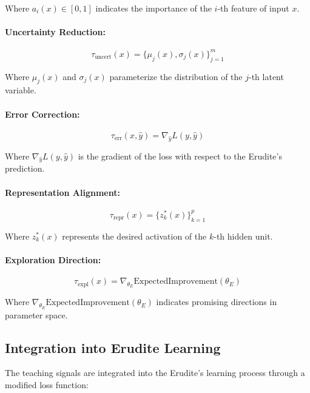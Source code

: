 Where $a_i(x) \in [0,1]$ indicates the importance of the $i$-th feature of input $x$.

\paragraph{Uncertainty Reduction:}
\begin{equation}
\tau_{\text{uncert}}(x) = \{\mu_j(x), \sigma_j(x)\}_{j=1}^m
\end{equation}

Where $\mu_j(x)$ and $\sigma_j(x)$ parameterize the distribution of the $j$-th latent variable.

\paragraph{Error Correction:}
\begin{equation}
\tau_{\text{err}}(x, \hat{y}) = \nabla_{\hat{y}} L(y, \hat{y})
\end{equation}

Where $\nabla_{\hat{y}} L(y, \hat{y})$ is the gradient of the loss with respect to the Erudite's prediction.

\paragraph{Representation Alignment:}
\begin{equation}
\tau_{\text{repr}}(x) = \{z_k^*(x)\}_{k=1}^p
\end{equation}

Where $z_k^*(x)$ represents the desired activation of the $k$-th hidden unit.

\paragraph{Exploration Direction:}
\begin{equation}
\tau_{\text{expl}}(x) = \nabla_{\theta_E} \text{ExpectedImprovement}(\theta_E)
\end{equation}

Where $\nabla_{\theta_E} \text{ExpectedImprovement}(\theta_E)$ indicates promising directions in parameter space.

\subsection{Integration into Erudite Learning}

The teaching signals are integrated into the Erudite's learning process through a modified loss function:


